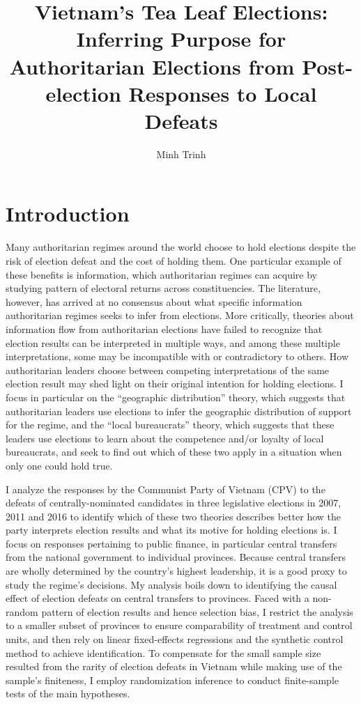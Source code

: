 \documentclass[12pt]{article}\usepackage[]{graphicx}\usepackage[]{color}
\title{Vietnam's Tea Leaf Elections: \\
	Inferring Purpose for Authoritarian Elections from Post-election Responses to Local Defeats}
\author{Minh Trinh}
\newcommand{\1}{\mathbbm{1}}
\begin{document}
\maketitle

\doublespacing

\section{Introduction}

Many authoritarian regimes around the world choose to hold elections despite the risk of election defeat and the cost of holding them. One particular example of these benefits is information, which authoritarian regimes can acquire by studying pattern of electoral returns across constituencies. The literature, however, has arrived at no consensus about what specific information authoritarian regimes seeks to infer from elections. More critically, theories about information flow from authoritarian elections have failed to recognize that election results can be interpreted in multiple ways, and among these multiple interpretations, some may be incompatible with or contradictory to others. How authoritarian leaders choose between competing interpretations of the same election result may shed light on their original intention for holding elections. I focus in particular on the ``geographic distribution'' theory, which suggests that authoritarian leaders use elections to infer the geographic distribution of support for the regime, and the ``local bureaucrats'' theory, which suggests that these leaders use elections to learn about the competence and/or loyalty of local bureaucrats, and seek to find out which of these two apply in a situation when only one could hold true.

I analyze the responses by the Communist Party of Vietnam (CPV) to the defeats of centrally-nominated candidates in three legislative elections in 2007, 2011 and 2016 to identify which of these two theories describes better how the party interprets election results and what its motive for holding elections is. I focus on responses pertaining to public finance, in particular central transfers from the national government to individual provinces. Because central transfers are wholly determined by the country's highest leadership, it is a good proxy to study the regime's decisions. My analysis boils down to identifying the causal effect of election defeats on central transfers to provinces. Faced with a non-random pattern of election results and hence selection bias, I restrict the analysis to a smaller subset of provinces to ensure comparability of treatment and control units, and then rely on linear fixed-effects regressions and the synthetic control method to achieve identification. To compensate for the small sample size resulted from the rarity of election defeats in Vietnam while making use of the sample's finiteness, I employ randomization inference to conduct finite-sample tests of the main hypotheses.
\end{document}
